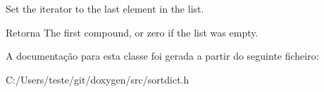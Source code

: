 Set the iterator to the last element in the list. \begin{DoxyReturn}{Retorna}
The first compound, or zero if the list was empty. 
\end{DoxyReturn}


A documentação para esta classe foi gerada a partir do seguinte ficheiro\-:\begin{DoxyCompactItemize}
\item 
C\-:/\-Users/teste/git/doxygen/src/sortdict.\-h\end{DoxyCompactItemize}
